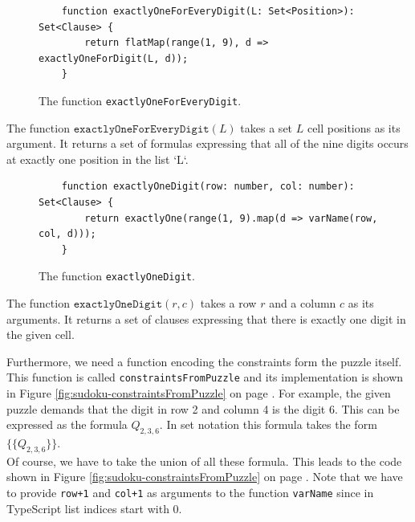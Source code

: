 \begin{figure}[!ht]
\centering
\begin{verbatim}
    function exactlyOneForEveryDigit(L: Set<Position>): Set<Clause> {
        return flatMap(range(1, 9), d => exactlyOneForDigit(L, d));
    }
\end{verbatim}
\vspace*{-0.3cm}
\caption{The function \texttt{exactlyOneForEveryDigit}.}
\label{fig:sudoku-exactlyOneDigit}
\end{figure}

The function $\texttt{exactlyOneForEveryDigit}(L)$ takes a set $L$ cell positions as its argument.  
It returns a set of formulas expressing that all of the nine digits occurs at exactly one position in the list `L`.

\begin{figure}[!ht]
\centering
\begin{verbatim}
    function exactlyOneDigit(row: number, col: number): Set<Clause> {
        return exactlyOne(range(1, 9).map(d => varName(row, col, d)));
    }
\end{verbatim}
\vspace*{-0.3cm}
\caption{The function \texttt{exactlyOneDigit}.}
\label{fig:sudoku-exactlyOneDigit}
\end{figure}

The function $\mathtt{exactlyOneDigit}(r, c)$ takes a row $r$ and a column $c$ as its arguments.
It returns a set of clauses expressing that there is exactly one digit in the given cell.

Furthermore, we need a function encoding the constraints form the puzzle itself.
This function is called \texttt{constraintsFromPuzzle} and its implementation is shown in Figure
\ref{fig:sudoku-constraintsFromPuzzle} on page \pageref{fig:sudoku-constraintsFromPuzzle}.
For example, the given puzzle demands that the digit in row 2 and column 4 is the digit $6$.
This can be expressed as the formula $Q_{2,3,6}$.  In set notation this formula takes the form
\\[0.2cm]
\hspace*{1.3cm}
$\bigl\{ \{Q_{2,3,6}\} \bigr\}$.
\\[0.2cm]
Of course, we have to take the union of all these formula.  This leads to the code shown in Figure
\ref{fig:sudoku-constraintsFromPuzzle} on page \pageref{fig:sudoku-constraintsFromPuzzle}.
Note that we have to provide \texttt{row+1} and \texttt{col+1} as arguments to the function \texttt{varName} since
in TypeScript list indices start with $0$.

